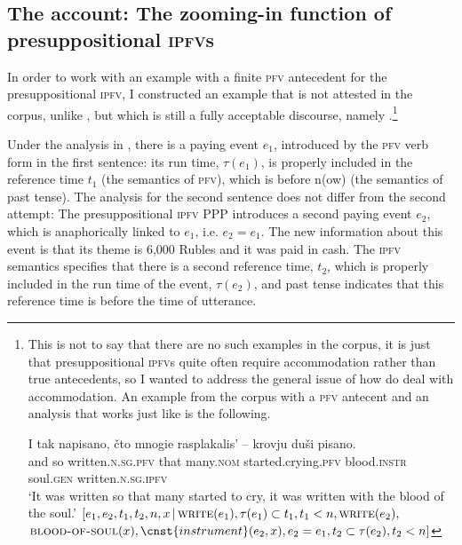 \documentclass[output=paper]{langscibook}
\begin{document}
\subsection{The account: The zooming-in function of presuppositional \textsc{ipfv}s}
\label{gehr:sec:acc}

In order to work with an example with a finite \textsc{pfv} antecedent for the presuppositional \textsc{ipfv}, I constructed an example that is not attested in the corpus, unlike , but which is still a fully acceptable discourse, namely .\footnote{This is not to say that there are no such examples in the corpus, it is just that presuppositional \textsc{ipfv}s quite often require accommodation rather than true antecedents, so I wanted to address the general issue of how do deal with accommodation. An example from the corpus with a \textsc{pfv} antecent and an analysis that works just like  is the following.

\ea 
\ea \gll I tak napisano, čto mnogie rasplakalis' -- krovju duši pisano.\\
and so written.\textsc{n.sg.pfv} that many.\textsc{nom} started.crying.\textsc{pfv} {} blood.\textsc{instr} soul.\textsc{gen} written.\textsc{n.sg.ipfv}\\
\glt `It was written so that many started to cry, it was written with the blood of the soul.'
\ex $[e_1, e_2, t_1, t_2, n, x\,|\,\textsc{write}(e_1), \tau(e_1) \subset t_1, t_1 < n, \textsc{write}(e_2),$\\ $\textsc{blood-of-soul}(x), \cnst{instrument}(e_2, x), e_2 = e_1, t_2 \subset \tau(e_2), t_2 < n]$
\z 
\z 
}

\ea\label{gehr:ex:zaplatili} 	
\ex[]{	$[e_1, e_2, t_1, t_2, n, x\,|\,\textsc{pay}(e_1), \tau(e_1) \subset t_1, t_1 < n, \textsc{pay}(e_2), \cnst{theme}(e_2, x),$\\ $\textsc{6,000R}(x), \textsc{in cash}(e_2), e_2 = e_1, t_2 \subset \tau(e_2), t_2 < n]$}\label{gehr:ex:zaplatilib}
\z 
\z 

\noindent Under the analysis in , there is a paying event $e_1$, introduced by the \textsc{pfv} verb form in the first sentence: its run time, $\tau(e_1)$, is properly included in the reference time $t_1$ (the semantics of \textsc{pfv}), which is before n(ow) (the semantics of past tense). The analysis for the second sentence does not differ from the second attempt: The presuppositional \textsc{ipfv} PPP introduces a second paying event $e_2$, which is anaphorically linked to $e_1$, i.e. $e_2 = e_1$. The new information about this event is that its theme is 6,000 Rubles and it was paid in cash. The \textsc{ipfv} semantics specifies that there is a second reference time, $t_2$, which is properly included in the run time of the event, $\tau(e_2)$, and past tense indicates that this reference time is before the time of utterance. 
\end{document}
